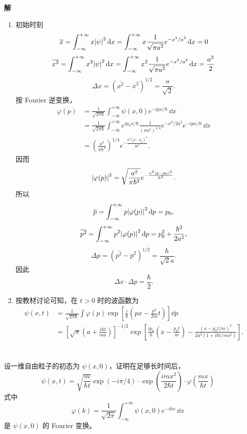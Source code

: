 \documentclass[12pt,a4paper]{article}
\begin{document}
\vspace{0.5cm}

\noindent\textbf{解}
\begin{enumerate}[label=(\arabic*)]
  \item 初始时刻
  \[
  \overline x = \int_{-\infty}^{+\infty} x\abs{\psi}^2\, \dd x
  = \int_{-\infty}^{+\infty} x\frac{1}{\sqrt{\pi a^2}}e^{-x^2/a^2}\, \dd x = 0
  \]
  \[
  \overline{x^2} = \int_{-\infty}^{+\infty}x^2\abs{\psi}^2\, \dd x
  = \int_{-\infty}^{+\infty}x^2\frac{1}{\sqrt{\pi a^2}}e^{-x^2/a^2}\, \dd x = \frac{a^2}{2}
  \]
  \[
  \Delta x = (\overline{x^2}-\overline x^2)^{1/2}=\frac{a}{\sqrt{2}}.
  \]
  按 Fourier 逆变换，
  \begin{align*}
    \varphi(p)&=\frac{1}{\sqrt{2\pi\hbar}}\int_{-\infty}^{+\infty}\psi(x,0)e^{-ipx/\hbar}\, \dd x \\
    &= \frac{1}{\sqrt{2\pi\hbar}}\int_{-\infty}^{+\infty}e^{ip_0x/\hbar}\frac{1}{(\pi a^2)^{1/4}}e^{-x^2/2a^2}e^{-ipx/\hbar}\, \dd x \\
    &= \left(\frac{a^2}{\pi\hbar^2}\right)^{1/4}
    e^{-\frac{a^2(p-p_0)^2}{2\hbar^2}}.
  \end{align*}
  因而
  \[
  \abs{\varphi(p)}^2 = \sqrt{\frac{a^2}{\pi\hbar^2}}e^{-\frac{a^2(p-p_0)^2}{\hbar^2}}.
  \]
  所以
  \[
  \overline p = \int_{-\infty}^{+\infty}p\abs{\varphi(p)}^2\, \dd p = p_0,
  \]
  \[
  \overline{p^2} = \int_{-\infty}^{+\infty}p^2\abs{\varphi(p)}^2\, \dd p = p_0^2 + \frac{\hbar^2}{2a^2},
  \]
  \[
  \Delta p = (\overline{p^2}-\overline p^2)^{1/2}=\frac{\hbar}{\sqrt{2}a}.
  \]
  因此
  \[
  \Delta x\cdot\Delta p = \frac{\hbar}{2}.
  \]

  \item 按教材讨论可知，在 $t>0$ 时的波函数为
  \begin{align*}
    \psi(x,t)&=\frac{1}{\sqrt{2\pi\hbar}}\int \varphi(p)
    \exp\left[\frac{i}{\hbar}\left(px-\frac{p^2}{2m}t\right)\right]\dd p \\
    & = [\sqrt{\pi}(a+\frac{i\hbar t}{ma})]^{-1/2}
    \exp\left[\frac{i p_0}{\hbar}\left(x-\frac{p_0 t}{m}\right)
    - \frac{\left(x-p_0 t/m\right)^2}{2a^2\left(1+i\hbar t/ma^2\right)}\right].
  \end{align*}
\end{enumerate}


\section{}
设一维自由粒子的初态为 $\psi(x,0)$，证明在足够长时间后，
\[
\psi(x,t)=\sqrt{\frac{m}{\hbar t}}\exp(-i\pi/4)\cdot
\exp\left(\frac{imx^2}{2\hbar t}\right)\cdot
\varphi\left(\frac{mx}{\hbar t}\right)
\]
式中
\[
\varphi(k)=\frac{1}{\sqrt{2\pi}}\int_{-\infty}^{+\infty}\psi(x,0)e^{-ikx}\, \dd x
\]
是 $\psi(x,0)$ 的 Fourier 变换。
\end{document}
